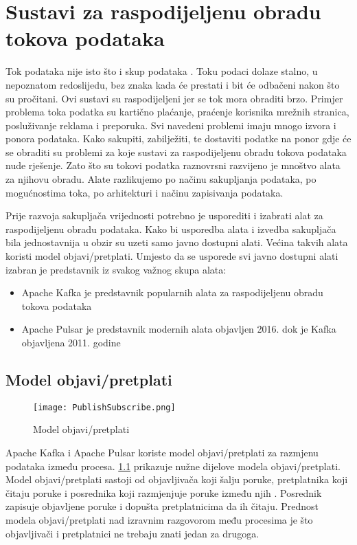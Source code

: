 \documentclass[utf8, diplomski, lmodern, numeric]{fer}
\begin{document}
\chapter{Sustavi za raspodijeljenu obradu tokova podataka}

Tok podataka nije isto što i skup podataka \citep{ilprints535}. Toku podaci dolaze stalno, u nepoznatom redoslijedu, bez znaka kada će prestati i bit će odbačeni nakon što su pročitani. Ovi sustavi su raspodijeljeni jer se tok mora obraditi brzo. Primjer problema toka podatka su kartično plaćanje, praćenje korisnika mrežnih stranica, posluživanje reklama i preporuka. Svi navedeni problemi imaju mnogo izvora i ponora podataka. Kako sakupiti, zabilježiti, te dostaviti podatke na ponor gdje će se obraditi su problemi za koje sustavi za raspodijeljenu obradu tokova podataka nude rješenje. Zato što su tokovi podatka raznovrsni razvijeno je mnoštvo alata za njihovu obradu. Alate razlikujemo po načinu sakupljanja podataka, po mogućnostima toka, po arhitekturi i načinu zapisivanja podataka.

Prije razvoja sakupljača vrijednosti potrebno je usporediti i izabrati alat za raspodijeljenu obradu podataka. Kako bi usporedba alata i izvedba sakupljača bila jednostavnija u obzir su uzeti samo javno dostupni alati. Većina takvih alata koristi model objavi/pretplati. Umjesto da se usporede svi javno dostupni alati izabran je predstavnik iz svakog važnog skupa alata:
\begin{itemize}
    \item Apache Kafka je predstavnik popularnih alata za raspodijeljenu obradu tokova podataka
    \item Apache Pulsar \citep{yahoo-blogpost} je predstavnik modernih alata objavljen 2016. dok je Kafka \citep{kafka-whitepaper} objavljena 2011. godine
\end{itemize}


\section{Model objavi/pretplati}

\begin{figure}[H]
    \centering
    \texttt{[image: PublishSubscribe.png]}
    \caption{Model objavi/pretplati}
    \label{fig:publish-subscribe}
\end{figure}

Apache Kafka i Apache Pulsar koriste model objavi/pretplati za razmjenu podataka između procesa. \ref{fig:publish-subscribe} prikazuje nužne dijelove modela objavi/pretplati. Model objavi/pretplati sastoji od objavljivača koji šalju poruke, pretplatnika koji čitaju poruke i posrednika koji razmjenjuje poruke između njih \citep{rassus-manual}. Posrednik zapisuje objavljene poruke i dopušta pretplatnicima da ih čitaju. Prednost modela objavi/pretplati nad izravnim razgovorom među procesima je što objavljivači i pretplatnici ne trebaju znati jedan za drugoga.
\end{document}
